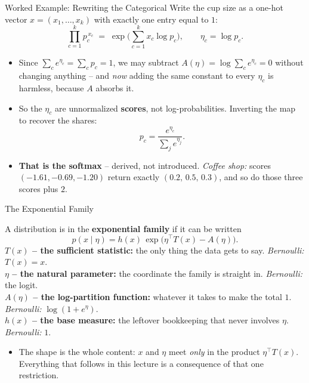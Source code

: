 \begin{frame}{Worked Example: Rewriting the Categorical}
\small
Write the cup size as a one-hot vector $x = (x_1, \dots, x_k)$ with exactly one entry equal to $1$:
\[
\prod_{c=1}^{k} p_c^{\,x_c}
\;=\; \exp\Big( \sum_{c=1}^{k} x_c \log p_c \Big),
\qquad \eta_c = \log p_c .
\]
\pause
\begin{itemize}
  \item Since $\sum_c e^{\eta_c} = \sum_c p_c = 1$, we may subtract $A(\eta) = \log\sum_c e^{\eta_c} = 0$ without changing anything -- and \emph{now} adding the same constant to every $\eta_c$ is harmless, because $A$ absorbs it.
  \pause
  \item So the $\eta_c$ are unnormalized \textbf{scores}, not log-probabilities. Inverting the map to recover the shares:
  \[
    p_c = \frac{e^{\eta_c}}{\sum_{j} e^{\eta_j}} .
  \]
  \pause
  \item \textbf{That is the softmax} -- derived, not introduced. \emph{Coffee shop:} scores $(-1.61, -0.69, -1.20)$ return exactly $(0.2,\, 0.5,\, 0.3)$, and so do those three scores plus $2$.
\end{itemize}
\end{frame}

\begin{frame}{The Exponential Family}
\begin{rldefinition}
A distribution is in the \textbf{exponential family} if it can be written
\[
p(x \mid \eta) = h(x)\,\exp\big( \eta^{\top} T(x) - A(\eta) \big) .
\]
\textbf{$T(x)$ -- the sufficient statistic:} the only thing the data gets to say. \emph{Bernoulli:} $T(x)=x$.\\
\textbf{$\eta$ -- the natural parameter:} the coordinate the family is straight in. \emph{Bernoulli:} the logit.\\
\textbf{$A(\eta)$ -- the log-partition function:} whatever it takes to make the total $1$. \emph{Bernoulli:} $\log(1+e^{\eta})$.\\
\textbf{$h(x)$ -- the base measure:} the leftover bookkeeping that never involves $\eta$. \emph{Bernoulli:} $1$.
\end{rldefinition}
\pause
\begin{itemize}
  \item The shape is the whole content: $x$ and $\eta$ meet \emph{only} in the product $\eta^{\top}T(x)$. Everything that follows in this lecture is a consequence of that one restriction.
\end{itemize}
\end{frame}

